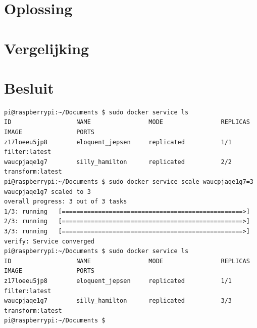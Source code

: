 \documentclass[twocolumn, a4paper]{article}
\begin{document}
\section{Oplossing}

\section{Vergelijking}

\section{Besluit}
\onecolumn

\appendix

\begin{verbatim}
pi@raspberrypi:~/Documents $ sudo docker service ls
ID                  NAME                MODE                REPLICAS            IMAGE               PORTS
z17loeeu5jp8        eloquent_jepsen     replicated          1/1                 filter:latest       
waucpjaqe1g7        silly_hamilton      replicated          2/2                 transform:latest    
pi@raspberrypi:~/Documents $ sudo docker service scale waucpjaqe1g7=3
waucpjaqe1g7 scaled to 3
overall progress: 3 out of 3 tasks 
1/3: running   [==================================================>] 
2/3: running   [==================================================>] 
3/3: running   [==================================================>] 
verify: Service converged 
pi@raspberrypi:~/Documents $ sudo docker service ls
ID                  NAME                MODE                REPLICAS            IMAGE               PORTS
z17loeeu5jp8        eloquent_jepsen     replicated          1/1                 filter:latest       
waucpjaqe1g7        silly_hamilton      replicated          3/3                 transform:latest    
pi@raspberrypi:~/Documents $ 
\end{verbatim}

\newpage

\end{document}
